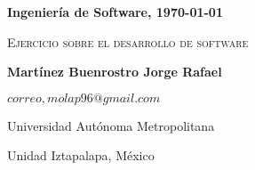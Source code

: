 \documentclass[letterpaper,11pt,twoside]{report}
\date{}
\begin{document}
	\centerline{\bf Ingenier\'ia de Software, \today}
	\centerline{}
	\begin{center}
		\Large{\textsc{Ejercicio sobre el desarrollo de software}}
	\end{center}
	
	\centerline{}
	\centerline{\textbf{Martínez Buenrostro Jorge Rafael}}
	\centerline{}
	
	\centerline{$correo, molap96@gmail.com$}
	
        \centerline{Universidad Aut\'onoma Metropolitana} 
	\centerline{Unidad Iztapalapa, M\'exico}
	
	\bigskip
	
    
    
\end{document}
